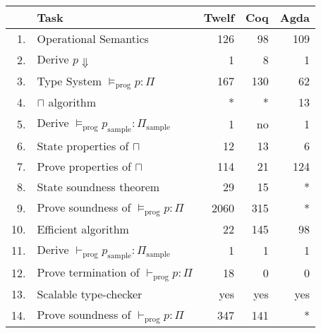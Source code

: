 \documentclass[review]{elsarticle}
\theoremstyle{definition}
\begin{document}
\begin{table}[!htb]
\begin{tabular}{rl|rrr}
    & Task                                         & \multicolumn{1}{l}{Twelf} & \multicolumn{1}{l}{Coq} & \multicolumn{1}{l}{Agda} \\ \hline
1.  & Operational Semantics                        & 126                       & 98                      & 109                      \\
2.  & Derive $p \Downarrow$                        & 1                         & 8                       & 1                        \\ \hline
3.  & Type System $\vDash_{\textrm{prog}} p : \Pi$ & 167                       & 130                     & 62                       \\
4.  & $\sqcap$ algorithm                           & *                         & *                       & 13                       \\
5.  & Derive $\vDash_{\textrm{prog}} p_{\textrm{sample}} : \Pi_{\textrm{sample}}$
                                                   & 1                         & no                      & 1                        \\
6.  & State properties of $\sqcap$                 & 12                        & 13                      & 6                        \\
7.  & Prove properties of $\sqcap$                 & 114                       & 21                      & 124                      \\
8.  & State soundness theorem                      & 29                        & 15                      & *                        \\
9.  & Prove soundness of $\vDash_{\textrm{prog}} p : \Pi$
                                                   & 2060                      & 315                     & *                        \\ \hline
10. & Efficient algorithm                          & 22                        & 145                     & 98                       \\
11. & Derive $\vdash_{\textrm{prog}} p_{\textrm{sample}} : \Pi_{\textrm{sample}}$
                                                   & 1                         & 1                       & 1                        \\
12. & Prove termination of $\vdash_{\textrm{prog}} p : \Pi$
                                                   & 18                        & 0                       & 0                        \\
13. & Scalable type-checker                        & yes                       & yes                     & yes                      \\
14. & Prove soundness of $\vdash_{\textrm{prog}} p : \Pi$
                                                   & 347                       & 141                     & *
\end{tabular}
\end{table}
\end{document}
